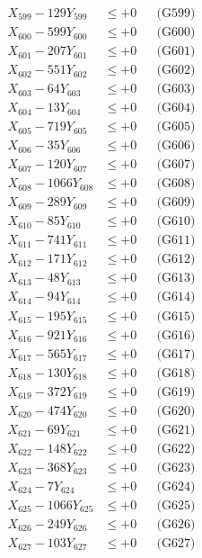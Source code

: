 \documentclass[a4paper,10pt]{article}
\begin{document}
{\begin{align}
X_{599} - 129Y_{599} &\leq +0 && \text{(G599)} \\
X_{600} - 599Y_{600} &\leq +0 && \text{(G600)} \\
\allowbreak
X_{601} - 207Y_{601} &\leq +0 && \text{(G601)} \\
X_{602} - 551Y_{602} &\leq +0 && \text{(G602)} \\
X_{603} - 64Y_{603} &\leq +0 && \text{(G603)} \\
X_{604} - 13Y_{604} &\leq +0 && \text{(G604)} \\
X_{605} - 719Y_{605} &\leq +0 && \text{(G605)} \\
X_{606} - 35Y_{606} &\leq +0 && \text{(G606)} \\
X_{607} - 120Y_{607} &\leq +0 && \text{(G607)} \\
X_{608} - 1066Y_{608} &\leq +0 && \text{(G608)} \\
X_{609} - 289Y_{609} &\leq +0 && \text{(G609)} \\
X_{610} - 85Y_{610} &\leq +0 && \text{(G610)} \\
\allowbreak
X_{611} - 741Y_{611} &\leq +0 && \text{(G611)} \\
X_{612} - 171Y_{612} &\leq +0 && \text{(G612)} \\
X_{613} - 48Y_{613} &\leq +0 && \text{(G613)} \\
X_{614} - 94Y_{614} &\leq +0 && \text{(G614)} \\
X_{615} - 195Y_{615} &\leq +0 && \text{(G615)} \\
X_{616} - 921Y_{616} &\leq +0 && \text{(G616)} \\
X_{617} - 565Y_{617} &\leq +0 && \text{(G617)} \\
X_{618} - 130Y_{618} &\leq +0 && \text{(G618)} \\
X_{619} - 372Y_{619} &\leq +0 && \text{(G619)} \\
X_{620} - 474Y_{620} &\leq +0 && \text{(G620)} \\
\allowbreak
X_{621} - 69Y_{621} &\leq +0 && \text{(G621)} \\
X_{622} - 148Y_{622} &\leq +0 && \text{(G622)} \\
X_{623} - 368Y_{623} &\leq +0 && \text{(G623)} \\
X_{624} - 7Y_{624} &\leq +0 && \text{(G624)} \\
X_{625} - 1066Y_{625} &\leq +0 && \text{(G625)} \\
X_{626} - 249Y_{626} &\leq +0 && \text{(G626)} \\
X_{627} - 103Y_{627} &\leq +0 && \text{(G627)} \\

\end{align}}
\end{document}
